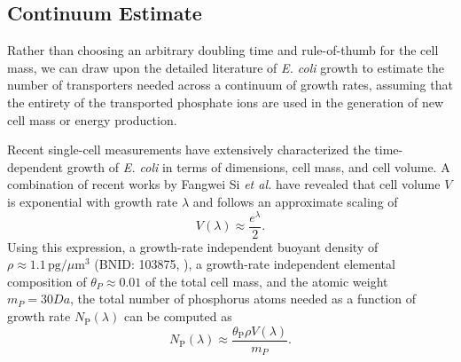 \documentclass[letterpaper, 10pt]{article}
\begin{document}
\begin{figure}
\end{figure}


\subsection{Continuum Estimate}
Rather than choosing an arbitrary doubling time and rule-of-thumb for the cell
mass, we can draw upon the detailed literature of \textit{E. coli} growth to
estimate the number of transporters needed across a continuum of growth rates,
assuming that the entirety of the transported phosphate ions are used in the
generation of new cell mass or energy production. 

Recent single-cell measurements have extensively characterized the
time-dependent growth of \textit{E. coli} in terms of dimensions, cell mass, and
cell volume. A combination of recent works by Fangwei Si \textit{et al.}
\cite{si2017, si2019} have revealed that cell volume $V$ is exponential with
growth rate $\lambda$ and follows an approximate scaling of 
\begin{equation}
    V(\lambda) \approx \frac{e^{\lambda}}{2}.
    \label{eq:si_vol}
\end{equation}
Using this expression, a growth-rate independent buoyant density of
$\rho \approx 1.1 \,\text{pg} / \mu\text{m}^3$ (BNID: 103875, \cite{milo2010}), a
growth-rate independent elemental composition of $\theta_P \approx 0.01$ of the
total cell mass, and the atomic weight $m_P = 30 Da$, the
total number of phosphorus atoms needed as a function of growth rate
$N_\text{P}(\lambda)$ can be
computed as 
\begin{equation}
    N_\text{P}(\lambda) \approx \frac{\theta_\text{P}\rho V(\lambda)}{m_{P}}.
\end{equation}
\end{document}
